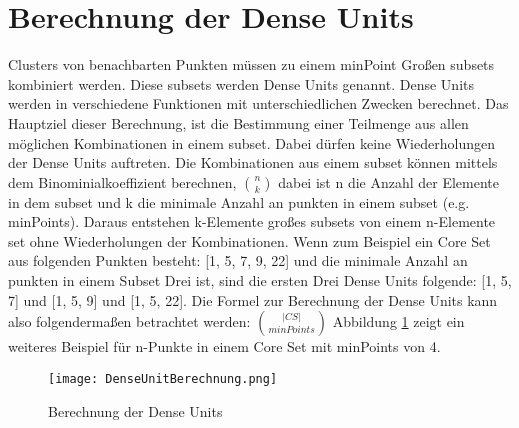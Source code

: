 \section{Berechnung der Dense Units}
\label{sec:chap3}

Clusters von benachbarten Punkten müssen zu einem minPoint Großen subsets kombiniert werden. Diese subsets werden Dense Units genannt.
Dense Units werden in verschiedene Funktionen mit unterschiedlichen Zwecken berechnet. Das Hauptziel dieser Berechnung, ist die Bestimmung einer Teilmenge aus allen möglichen Kombinationen in einem subset. Dabei dürfen keine Wiederholungen der Dense Units auftreten. Die Kombinationen aus einem subset können mittels dem Binominialkoeffizient berechnen, $ \binom{n}{k} $ dabei ist n die Anzahl der Elemente in dem subset und k die minimale Anzahl an punkten in einem subset (e.g. minPoints). Daraus entstehen k-Elemente großes subsets von einem n-Elemente set ohne Wiederholungen der Kombinationen.
Wenn zum Beispiel ein Core Set aus folgenden Punkten besteht: [1, 5, 7, 9, 22] und die minimale Anzahl an punkten in einem Subset Drei ist, sind die ersten Drei Dense Units folgende: [1, 5, 7] und [1, 5, 9] und [1, 5, 22]. Die Formel zur Berechnung der Dense Units kann also folgendermaßen betrachtet werden: 
$ \binom{|CS|}{minPoints}$ \cite{7022654} Abbildung \ref{dense-calculation} zeigt ein weiteres Beispiel für n-Punkte in einem Core Set mit minPoints von 4.

\begin{figure}
	\centering
	\texttt{[image: DenseUnitBerechnung.png]}
	\caption{Berechnung der Dense Units}
	\label{dense-calculation}
\end{figure}